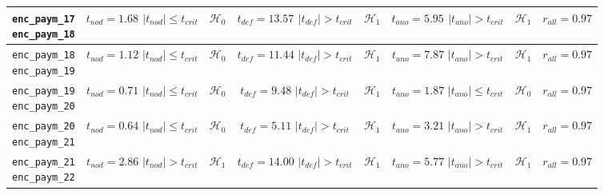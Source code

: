 \begin{table}[H]
{\begin{tabular}{|c|c|c|c|c|c|c|c|}
		\specialcell{\texttt{enc\_paym\_{17}}\\\texttt{enc\_paym\_{18}}} &
		\specialcell{$t_{nod} = 1.68$\\$|t_{nod}| \le t_{crit}$} & $\mathcal{H}_0$ &
		\specialcell{$t_{def} = 13.57$\\$|t_{def}| > t_{crit}$} & $\mathcal{H}_1$ &
		\specialcell{$t_{ano} = 5.95$\\$|t_{ano}| > t_{crit}$} & $\mathcal{H}_1$ &
		$r_{all} = 0.97$ \\ \hline
		
		\specialcell{\texttt{enc\_paym\_{18}}\\\texttt{enc\_paym\_{19}}} &
		\specialcell{$t_{nod} = 1.12$\\$|t_{nod}| \le t_{crit}$} & $\mathcal{H}_0$ &
		\specialcell{$t_{def} = 11.44$\\$|t_{def}| > t_{crit}$} & $\mathcal{H}_1$ &
		\specialcell{$t_{ano} = 7.87$\\$|t_{ano}| > t_{crit}$} & $\mathcal{H}_1$ &
		$r_{all} = 0.97$ \\ \hline
		
		\specialcell{\texttt{enc\_paym\_{19}}\\\texttt{enc\_paym\_{20}}} &
		\specialcell{$t_{nod} = 0.71$\\$|t_{nod}| \le t_{crit}$} & $\mathcal{H}_0$ &
		\specialcell{$t_{def} = 9.48$\\$|t_{def}| > t_{crit}$} & $\mathcal{H}_1$ &
		\specialcell{$t_{ano} = 1.87$\\$|t_{ano}| \le t_{crit}$} & $\mathcal{H}_0$ &
		$r_{all} = 0.97$ \\ \hline
		
		\specialcell{\texttt{enc\_paym\_{20}}\\\texttt{enc\_paym\_{21}}} &
		\specialcell{$t_{nod} = 0.64$\\$|t_{nod}| \le t_{crit}$} & $\mathcal{H}_0$ &
		\specialcell{$t_{def} = 5.11$\\$|t_{def}| > t_{crit}$} & $\mathcal{H}_1$ &
		\specialcell{$t_{ano} = 3.21$\\$|t_{ano}| > t_{crit}$} & $\mathcal{H}_1$ &
		$r_{all} = 0.97$ \\ \hline
		
		\specialcell{\texttt{enc\_paym\_{21}}\\\texttt{enc\_paym\_{22}}} &
		\specialcell{$t_{nod} = 2.86$\\$|t_{nod}| > t_{crit}$} & $\mathcal{H}_1$ &
		\specialcell{$t_{def} = 14.00$\\$|t_{def}| > t_{crit}$} & $\mathcal{H}_1$ &
		\specialcell{$t_{ano} = 5.77$\\$|t_{ano}| > t_{crit}$} & $\mathcal{H}_1$ &
		$r_{all} = 0.97$ \\ \hline
		

\end{tabular}}
\end{table}
